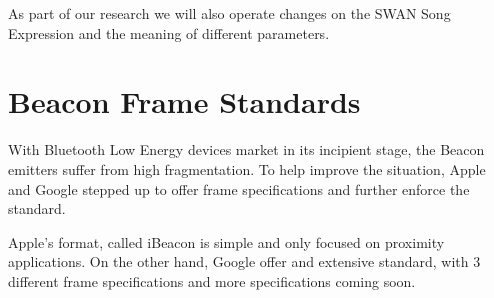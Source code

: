 As part of our research we will also operate changes on the SWAN Song Expression and the meaning of different parameters.

\section{Beacon Frame Standards}
With Bluetooth Low Energy devices market in its incipient stage, the Beacon  emitters suffer from high fragmentation.
To help improve the situation, Apple and Google stepped up to offer frame specifications and further enforce the standard.

Apple's format, called iBeacon is simple and only focused on proximity applications.
On the other hand, Google offer and extensive standard, with 3 different frame specifications and more specifications coming soon.
